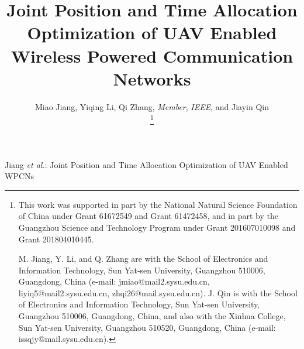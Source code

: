 \documentclass[journal]{IEEEtran}
\begin{document}
	
\title{Joint Position and Time Allocation Optimization of UAV Enabled Wireless Powered Communication Networks}
	
\author{Miao Jiang, Yiqing Li, Qi Zhang, \emph{Member}, \emph{IEEE}, and Jiayin Qin

\thanks{This work was supported in part by the National Natural Science Foundation of China under Grant 61672549 and Grant 61472458, and in part by the Guangzhou Science and Technology Program under Grant 201607010098 and Grant 201804010445.

M. Jiang, Y. Li, and Q. Zhang are with the School of Electronics and Information Technology, Sun Yat-sen University, Guangzhou 510006, Guangdong, China (e-mail: jmiao@mail2.sysu.edu.cn, liyiq5@mail2.sysu.edu.cn, zhqi26@mail.sysu.edu.cn). J. Qin is with the School of Electronics and
Information Technology, Sun Yat-sen University, Guangzhou 510006, Guangdong,  China, and also with the Xinhua College, Sun Yat-sen University, Guangzhou 510520, Guangdong, China (e-mail: issqjy@mail.sysu.edu.cn). }
}%
	
	
{Jiang \MakeLowercase{\textit{et al.}}: Joint Position and Time Allocation Optimization of UAV Enabled WPCNs}
	
\end{document}
